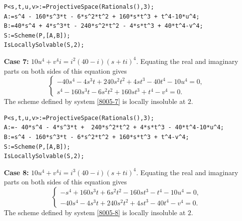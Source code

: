\documentclass[a4paper,12pt,english,reqno]{amsart}
\begin{document}
\begin{lstlisting}
P<s,t,u,v>:=ProjectiveSpace(Rationals(),3);
A:=s^4 - 160*s^3*t - 6*s^2*t^2 + 160*s*t^3 + t^4-10*u^4;
B:=40*s^4 + 4*s^3*t - 240*s^2*t^2 - 4*s*t^3 + 40*t^4-v^4;
S:=Scheme(P,[A,B]);
IsLocallySolvable(S,2);
\end{lstlisting}

{\bf Case 7:} $10u^4+v^4i=i^2(40-i)(s+ti)^4$. Equating the real and imaginary parts on both sides of this equation gives
\begin{equation}\label{8005-7}
\begin{cases}
-40s^4 - 4s^3t + 240s^2t^2 + 4st^3 - 40t^4 - 10u^4=0,\\
s^4 - 160s^3t - 6s^2t^2 + 160st^3 + t^4 - v^4=0.
\end{cases}
\end{equation}
The scheme defined by system \eqref{8005-7} is locally insoluble at $2$.

\begin{lstlisting}
P<s,t,u,v>:=ProjectiveSpace(Rationals(),3);
A:=- 40*s^4 - 4*s^3*t +  240*s^2*t^2 + 4*s*t^3 - 40*t^4-10*u^4;
B:=s^4 - 160*s^3*t - 6*s^2*t^2 + 160*s*t^3 + t^4-v^4;
S:=Scheme(P,[A,B]);
IsLocallySolvable(S,2);
\end{lstlisting}


{\bf Case 8:} $10u^4+v^4i=i^3(40-i)(s+ti)^4$. Equating the real and imaginary parts on both sides of this equation gives
\begin{equation}\label{8005-8}
\begin{cases}
-s^4 + 160s^3t + 6s^2t^2 - 160st^3 - t^4 - 10u^4=0,\\
-40s^4 - 4s^3t + 240s^2t^2 + 4st^3 - 40t^4 - v^4=0.
\end{cases}
\end{equation}
The scheme defined by system \eqref{8005-8} is locally insoluble at $2$.
\end{document}
